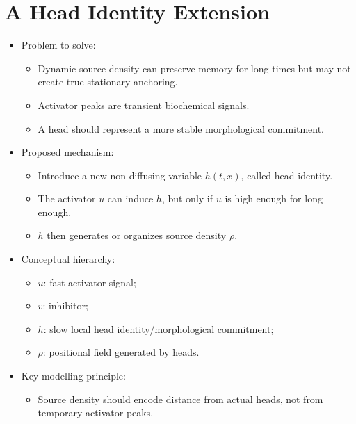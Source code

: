 \section{A Head Identity Extension}


\begin{itemize}
    \item Problem to solve:
    \begin{itemize}
        \item Dynamic source density can preserve memory for long times but may not create true stationary anchoring.
        \item Activator peaks are transient biochemical signals.
        \item A head should represent a more stable morphological commitment.
    \end{itemize}
    \item Proposed mechanism:
    \begin{itemize}
        \item Introduce a new non-diffusing variable \(h(t,x)\), called head identity.
        \item The activator \(u\) can induce \(h\), but only if \(u\) is high enough for long enough.
        \item \(h\) then generates or organizes source density \(\rho\).
    \end{itemize}
    \item Conceptual hierarchy:
    \begin{itemize}
        \item \(u\): fast activator signal;
        \item \(v\): inhibitor;
        \item \(h\): slow local head identity/morphological commitment;
        \item \(\rho\): positional field generated by heads.
    \end{itemize}
    \item Key modelling principle:
    \begin{itemize}
        \item Source density should encode distance from actual heads, not from temporary activator peaks.
    \end{itemize}

\end{itemize}
